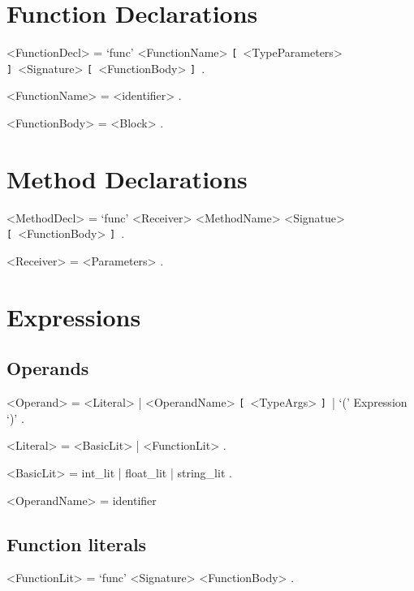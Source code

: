 \documentclass{article}
\def\lopt{\synshortsoff\texttt{[}\synshorts~}
\def\ropt{\synshortsoff\texttt{]}\synshorts~}
\begin{document}
\section*{Function Declarations} 
\begin{grammar} 
	<FunctionDecl> = `func' <FunctionName> \lopt <TypeParameters> \ropt <Signature> \lopt <FunctionBody> \ropt .
	
	<FunctionName> = <identifier> .
	
	<FunctionBody> = <Block> .
\end{grammar} 

\section*{Method Declarations}
\begin{grammar} 
	<MethodDecl> = `func' <Receiver> <MethodName> <Signatue> \lopt <FunctionBody> \ropt .

	<Receiver> = <Parameters> . 
\end{grammar} 

\section*{Expressions}
\subsection*{Operands}
\begin{grammar}
	<Operand> = <Literal> | <OperandName> \lopt <TypeArgs> \ropt | `(' Expression `)' .

	<Literal> = <BasicLit> | <FunctionLit> . %

	<BasicLit> = int_lit | float_lit | string_lit . %

	<OperandName> = identifier %
\end{grammar}

\subsection*{Function literals}
\begin{grammar}
	<FunctionLit> = `func' <Signature> <FunctionBody> .
\end{grammar}
\end{document}
